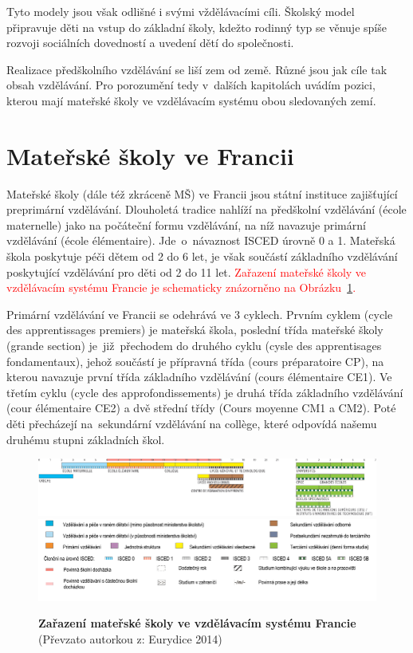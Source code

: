 		Tyto modely jsou však odlišné i svými vždělávacími cíli. Školský model připravuje děti na vstup do základní školy, kdežto rodinný typ se věnuje spíše rozvoji sociálních dovedností a uvedení dětí do společnosti.

		Realizace předškolního vzdělávání se liší zem od země. Různé jsou jak cíle tak obsah vzdělávání. Pro porozumění tedy v~dalších kapitolách uvádím pozici, kterou mají mateřské školy ve vzdělávacím systému obou sledovaných zemí. 
		

	\section{Mateřské školy ve Francii}
	\label{msvefr}

		Mateřské školy (dále též zkráceně MŠ) ve Francii jsou státní instituce zajišťující preprimární vzdělávání. 
		Dlouholetá tradice nahlíží na předškolní vzdělávání (école maternelle) jako na počáteční formu vzdělávání, na níž navazuje primární vzdělávání (école élémentaire). Jde o návaznost ISCED  úrovně 0 a 1. Mateřská škola poskytuje péči dětem od 2 do 6 let, je však součástí základního vzdělávání poskytující vzdělávání pro děti od 2 do 11 let.
		\textcolor{red}{Zařazení mateřské školy ve vzdělávacím systému Francie je schematicky znázorněno na Obrázku~\ref{obr:msFR}.}

		Primární vzdělávání ve Francii se odehrává ve 3 cyklech. Prvním cyklem (cycle des apprentissages premiers) je mateřská škola, poslední třída mateřské školy (grande section) je již přechodem do druhého cyklu (cysle des apprentisages fondamentaux), jehož součástí je přípravná třída (cours préparatoire CP), na kterou navazuje první třída základního vzdělávání (cours élémentaire CE1). Ve třetím cyklu (cycle des approfondissements) je druhá třída základního vzdělávání (cour élémentaire CE2) a dvě střední třídy (Cours moyenne CM1 a CM2). Poté děti přecházejí na sekundární vzdělávání na collège, které odpovídá našemu druhému stupni základních škol. 

		\begin{figure} [h!]
			\center
			\includegraphics[width=1.0\linewidth]{fotky/msFR.png} \\
			\includegraphics[width=1.0\linewidth]{fotky/msVysvetlivky.png}
			\caption{ \textbf{Zařazení mateřské školy ve vzdělávacím systému Francie}
			(Převzato autorkou z: Eurydice 2014)
			}
			\label{obr:msFR}
		\end{figure}

